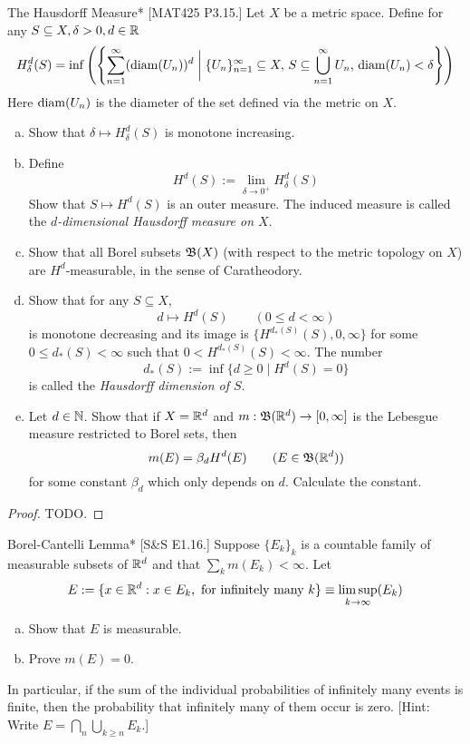 \begin{problem}{The Hausdorff Measure}*
    [MAT425 P3.15.] Let \(X\) be a metric space. Define for any \(S \subseteq X, \delta > 0, d \in \mathbb{R}\) 
    \[
        H_\delta^d(S) = \inf \left( \left\{ \sum_{n=1}^\infty (\operatorname{diam}(U_n))^d \;\biggr\rvert\; \{U_n\}_{n=1}^\infty \subseteq X, \, S \subseteq \bigcup_{n=1}^\infty U_n, \, \operatorname{diam}(U_n) < \delta \right\} \right)
    \]
    Here \(\operatorname{diam}(U_n)\) is the diameter of the set defined via the metric on \(X\). 
    \begin{enumerate}[(a)]
        \itemsep0em
        \item Show that \(\delta \mapsto H_\delta^d(S)\) is monotone increasing. 
        \item Define 
        \[
            H^d(S) := \lim_{ \delta \to 0^+} H_\delta^d(S)
        \]
        Show that \(S \mapsto H^d(S)\) is an outer measure. The induced measure is called the \emph{\(d\)-dimensional Hausdorff measure on \(X\)}.  
        \item Show that all Borel subsets \(\mathfrak{B}(X)\) (with respect to the metric topology on \(X\)) are \(H^d\)-measurable, in the sense of Caratheodory. 
        \item Show that for any \(S \subseteq X\),
        \[
            d \mapsto H^d(S) \qquad (0 \leq d < \infty)
        \]
        is monotone decreasing and its image is \(\{H^{d_*(S)}(S), 0, \infty\}\) for some \(0 \leq d_*(S) < \infty\) such that \(0 < H^{d_*(S)}(S) < \infty\). The number 
        \[
            d_*(S) := \inf \{ d \geq 0 \mid H^d(S) = 0 \}
        \]
        is called the \emph{Hausdorff dimension of \(S\)}. 
        \item Let \(d \in \mathbb{N}\). Show that if \(X = \mathbb{R}^d\) and \(m : \mathfrak{B}(\mathbb{R}^d) \to [0, \infty]\) is the Lebesgue measure restricted to Borel sets, then 
        \[
            m(E) = \beta_d H^d(E)
            \qquad 
            (E \in \mathfrak{B}(\mathbb{R}^d))
        \]
        for some constant \(\beta_d\) which only depends on \(d\). Calculate the constant. 
    \end{enumerate}
\end{problem}

\begin{proof}
    TODO. 
\end{proof}


\begin{problem}{Borel-Cantelli Lemma}*
    [S\&S E1.16.] Suppose \(\{E_k\}_k\) is a countable family of measurable subsets of \(\mathbb{R}^d\) and that \(\sum_k m(E_k) < \infty\). Let 
    \[
    E := \{x \in \mathbb{R}^d : x \in E_k, \text{ for infinitely many } k\}
    \equiv \limsup_{k \to \infty} (E_k)
    \]
    \begin{enumerate}[(a)]
        \itemsep0em
        \item Show that \(E\) is measurable. 
        \item Prove \(m(E) = 0\). 
    \end{enumerate}
    In particular, if the sum of the individual probabilities of infinitely many events is finite, then the probability that infinitely many of them occur is zero. [Hint: Write \(E = \bigcap_n \bigcup_{k \geq n} E_k\).]
\end{problem}

